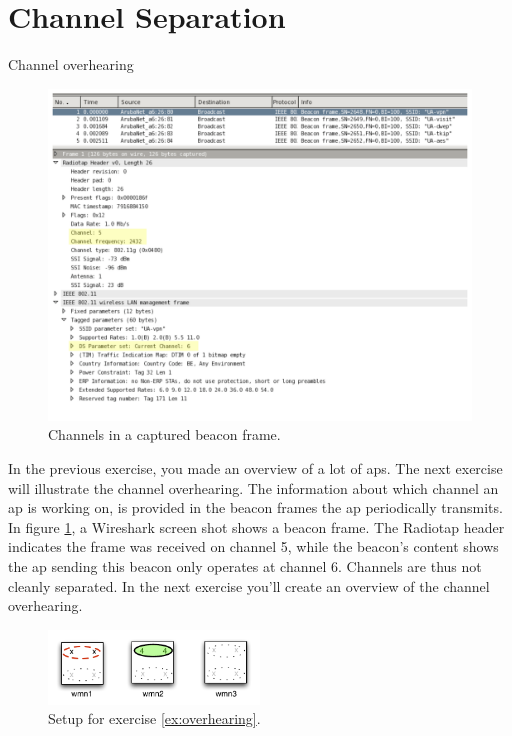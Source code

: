 \section{Channel Separation}

\begin{exercise}{Channel overhearing} \label{ex:overhearing}
	
	\begin{figure}[h]
		\begin{center}
			\includegraphics[width=\textwidth]{images/beacon.pdf}
			\caption{Channels in a captured beacon frame.} 
			\label{fig:beacons} 
		\end{center}
	\end{figure}
	
	
In the previous exercise, you made an overview of a lot of \aclp{ap}. The next exercise will illustrate the channel overhearing. The information about which channel an \ac{ap} is working on, is provided in the beacon frames the \ac{ap} periodically transmits. In figure \ref{fig:beacons}, a Wireshark\cite{wireshark} screen shot shows a beacon frame. The Radiotap header indicates the frame was received on channel 5, while the beacon's content shows the \ac{ap} sending this beacon only operates at channel 6. Channels are thus not cleanly separated.  In the next exercise you'll create an overview of the channel overhearing.

\begin{figure}[h!]
		\begin{center}
			\includegraphics[width=0.5\textwidth]{images/channels2.pdf}
			\caption{Setup for exercise \ref{ex:overhearing}.} 
			\label{fig:channels2} 
		\end{center}
\end{figure}
	

\end{exercise}
